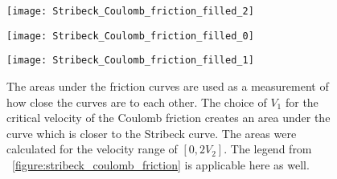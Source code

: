 \begin{figure}
	\begin{minipage}[t]{\linewidth}
			\begin{minipage}[t]{0.325\linewidth}
				\centering
				\texttt{[image: Stribeck\_Coulomb\_friction\_filled\_2]}
				\label{fig:Stribeck_Coulomb_friction_filled_2}
			\end{minipage}
			\hfill
			\begin{minipage}[t]{0.325\linewidth}
				\centering
				\texttt{[image: Stribeck\_Coulomb\_friction\_filled\_0]}
				\label{fig:Stribeck_Coulomb_friction_filled_0}
			\end{minipage}
			\hfill
			\begin{minipage}[t]{0.325\linewidth}
				\centering
				\texttt{[image: Stribeck\_Coulomb\_friction\_filled\_1]}
				\label{fig:Stribeck_Coulomb_friction_filled_1}
			\end{minipage}
	\end{minipage}
	\caption[Areas under friction curves]{The areas under the friction curves are used as a measurement of how close the curves are to each other.  The choice of $V_1$ for the critical velocity of the Coulomb friction creates an area under the curve which is closer to the Stribeck curve.  The areas were calculated for the velocity range of $[0, 2V_2]$.  The legend from \figurename~\ref{figure:stribeck_coulomb_friction} is applicable here as well.}
	\label{fig:frictionmodelareaundercurves}
\end{figure}
